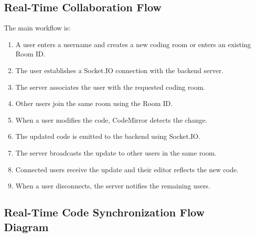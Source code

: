 \documentclass[11pt,letterpaper]{article}
\begin{document}
\subsection{Real-Time Collaboration Flow}
The main workflow is:
\begin{enumerate}
\item A user enters a username and creates a new coding room or enters an existing Room ID.
\item The user establishes a Socket.IO connection with the backend server.
\item The server associates the user with the requested coding room.
\item Other users join the same room using the Room ID.
\item When a user modifies the code, CodeMirror detects the change.
\item The updated code is emitted to the backend using Socket.IO.
\item The server broadcasts the update to other users in the same room.
\item Connected users receive the update and their editor reflects the new code.
\item When a user disconnects, the server notifies the remaining users.
\end{enumerate}

\subsection{Real-Time Code Synchronization Flow Diagram}
\begin{center}
\end{center}
\end{document}
